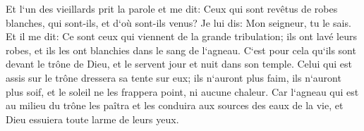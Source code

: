 \verse Et l`un des vieillards prit la parole et me dit: Ceux qui sont revêtus de robes blanches, qui sont-ils, et d`où sont-ils venus? 
\verse Je lui dis: Mon seigneur, tu le sais. Et il me dit: Ce sont ceux qui viennent de la grande tribulation; ils ont lavé leurs robes, et ils les ont blanchies dans le sang de l`agneau. 
\verse C`est pour cela qu`ils sont devant le trône de Dieu, et le servent jour et nuit dans son temple. Celui qui est assis sur le trône dressera sa tente sur eux; 
\verse ils n`auront plus faim, ils n`auront plus soif, et le soleil ne les frappera point, ni aucune chaleur. 
\verse Car l`agneau qui est au milieu du trône les paîtra et les conduira aux sources des eaux de la vie, et Dieu essuiera toute larme de leurs yeux. 

